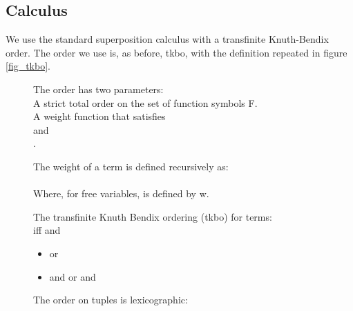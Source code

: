 \newpage
\subsection*{Calculus}
We use the standard superposition calculus with a transfinite Knuth-Bendix order.
The order we use is, as before, tkbo, with the definition repeated in figure \ref{fig_tkbo}.

\begin{figure}
The order has two parameters:\\
A strict total order \m{\succ} on the set of function symbols F.\\
A weight function  that satisfies \\
 and\\
.

\bigskip

\noindent
The weight of a term is defined recursively as:\\
\\
Where, for free variables,  is defined by w.

\bigskip

\noindent
The transfinite Knuth Bendix ordering (tkbo) for terms:\\
 iff  and
\begin{itemize}
	\item {} or
	\item {} and
		\subitem {} or
		\subitem {} and 
\end{itemize}
The order on tuples is lexicographic:\\

\bigskip


\end{figure}
